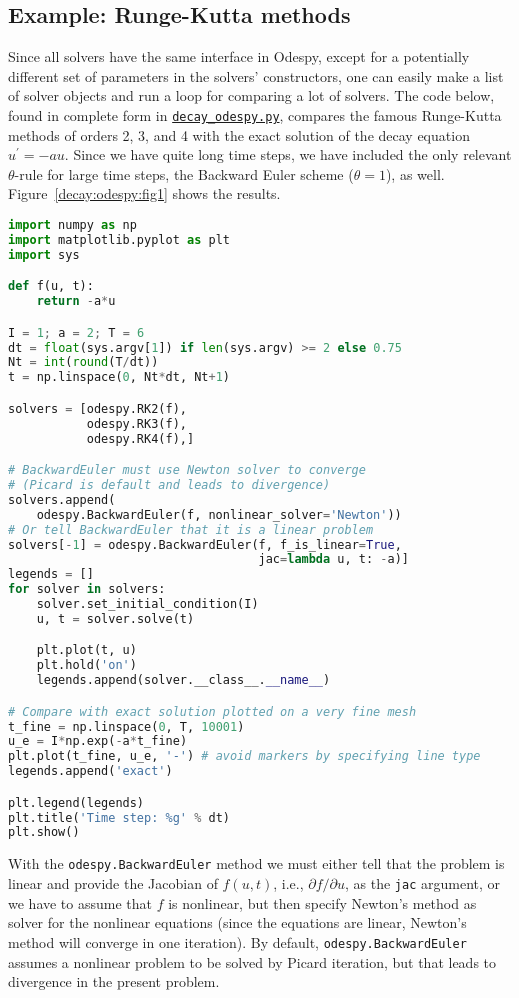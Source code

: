 \documentclass[graybox,sectrefs,envcountresetchap,open=right,final]{svmonodo}
\begin{document}
\noindent
\subsection{Example: Runge-Kutta methods}

Since all solvers have the same interface in Odespy, except for a
potentially different set of
parameters in the solvers' constructors, one can easily make a list of
solver objects and run a loop for comparing a lot of solvers. The
code below, found in complete form in \href{{http://tinyurl.com/ofkw6kc/genz/decay_odespy.py}}{\nolinkurl{decay_odespy.py}},
compares the famous Runge-Kutta methods of orders 2, 3, and 4
with the exact solution of the decay equation
$u^{\prime}=-au$.
Since we have quite long time steps, we have included the only
relevant $\theta$-rule for large time steps, the Backward Euler scheme
($\theta=1$), as well.
Figure~\ref{decay:odespy:fig1} shows the results.

\begin{lstlisting}[language=Python,style=blue1_bluegreen]
import numpy as np
import matplotlib.pyplot as plt
import sys

def f(u, t):
    return -a*u

I = 1; a = 2; T = 6
dt = float(sys.argv[1]) if len(sys.argv) >= 2 else 0.75
Nt = int(round(T/dt))
t = np.linspace(0, Nt*dt, Nt+1)

solvers = [odespy.RK2(f),
           odespy.RK3(f),
           odespy.RK4(f),]

# BackwardEuler must use Newton solver to converge
# (Picard is default and leads to divergence)
solvers.append(
    odespy.BackwardEuler(f, nonlinear_solver='Newton'))
# Or tell BackwardEuler that it is a linear problem
solvers[-1] = odespy.BackwardEuler(f, f_is_linear=True,
                                   jac=lambda u, t: -a)]
legends = []
for solver in solvers:
    solver.set_initial_condition(I)
    u, t = solver.solve(t)

    plt.plot(t, u)
    plt.hold('on')
    legends.append(solver.__class__.__name__)

# Compare with exact solution plotted on a very fine mesh
t_fine = np.linspace(0, T, 10001)
u_e = I*np.exp(-a*t_fine)
plt.plot(t_fine, u_e, '-') # avoid markers by specifying line type
legends.append('exact')

plt.legend(legends)
plt.title('Time step: %g' % dt)
plt.show()
\end{lstlisting}
With the \texttt{odespy.BackwardEuler} method we must either tell that
the problem is linear and provide the Jacobian of $f(u,t)$, i.e.,
$\partial f/\partial u$, as the \texttt{jac} argument, or we have to assume
that $f$ is nonlinear, but then specify Newton's method as solver
for the nonlinear equations (since the equations are linear, Newton's
method will converge in one iteration). By default,
\texttt{odespy.BackwardEuler} assumes a nonlinear problem to be solved by
Picard iteration, but that leads to divergence in the present problem.
\end{document}
